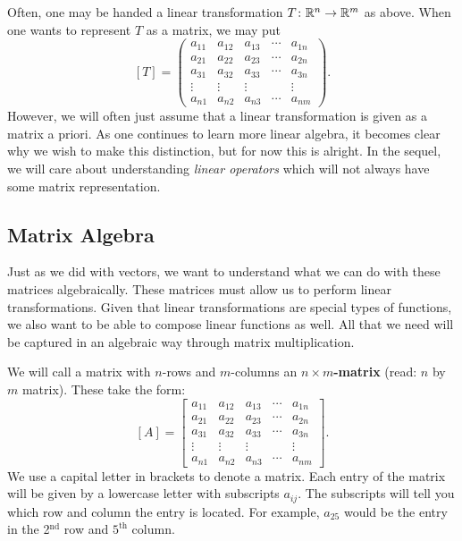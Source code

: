         Often, one may be handed a linear transformation $T\colon \mathbb{R}^n \to \mathbb{R}^m$ as above. When one wants to represent $T$ as a matrix, we may put
        \[
        [T]=        \begin{pmatrix}
        a_{11} & a_{12} & a_{13} & \cdots & a_{1n}\\
        a_{21} & a_{22} & a_{23} & \cdots & a_{2n}\\
        a_{31} & a_{32} & a_{33} & \cdots & a_{3n}\\
        \vdots & \vdots & \vdots & & \vdots \\
        a_{n1} & a_{n2} & a_{n3} & \cdots & a_{nm}
        \end{pmatrix}.
        \]
        However, we will often just assume that a linear transformation is given as a matrix a priori.  As one continues to learn more linear algebra, it becomes clear why we wish to make this distinction, but for now this is alright.  In the sequel, we will care about understanding \emph{linear operators} which will not always have some matrix representation.
        
        \subsection{Matrix Algebra}
        Just as we did with vectors, we want to understand what we can do with these matrices algebraically.  These matrices must allow us to perform linear transformations.  Given that linear transformations are special types of functions, we also want to be able to compose linear functions as well.  All that we need will be captured in an algebraic way through matrix multiplication.  
        
        We will call a matrix with $n$-rows and $m$-columns an \textbf{$n\times m$-matrix} (read: $n$ by $m$ matrix).  These take the form:
        \[[A]=
        \begin{bmatrix}
        a_{11} & a_{12} & a_{13} & \cdots & a_{1n}\\
        a_{21} & a_{22} & a_{23} & \cdots & a_{2n}\\
        a_{31} & a_{32} & a_{33} & \cdots & a_{3n}\\
        \vdots & \vdots & \vdots & & \vdots \\
        a_{n1} & a_{n2} & a_{n3} & \cdots & a_{nm}
        \end{bmatrix}.
        \]
        We use a capital letter in brackets to denote a matrix. Each entry of the matrix will be given by a lowercase letter with subscripts $a_{ij}$.  The subscripts will tell you which row and column the entry is located. For example, $a_{25}$ would be the entry in the 2$^\textrm{nd}$ row and $5^\textrm{th}$ column.
        
